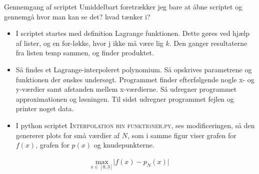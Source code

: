
\begin{frame}{Gennemgang af scriptet}
Umiddelbart foretrækker jeg bare at åbne scriptet og gennemgå hvor man kan se det? hvad tænker i?
    \begin{itemize}
        \item I scriptet startes med definition Lagrange funktionen. 
        Dette gøres ved hjælp af lister, og en for-løkke, hvor j ikke må være lig $k$. 
        Den ganger resultaterne fra listen temp sammen, og finder produktet.
    
        \item Så findes et Lagrange-interpoleret polynomium. 
        Så opskrives parametrene og funktionen der ønskes undersøgt. 
        Programmet finder efterfølgende nogle x- og y-værdier samt afstanden mellem x-værdierne. 
        Så udregner programmet approximationen og løsningen. 
        Til sidst udregner programmet fejlen og printer noget data. 
    
        \item I python scriptet \textsc{Interpolation bin funktioner.py}, ses modificeringen, så den genererer plots for små værdier af $N$, som i samme figur viser grafen for $f(x)$, grafen for $p(x)$ og knudepunkterne. 
    \end{itemize}
    \begin{align*}
    \underset{x \in \left [0,3 \right ]}{\text{max}} \lvert f(x)-p_N(x) \rvert
    \end{align*}
\end{frame}

